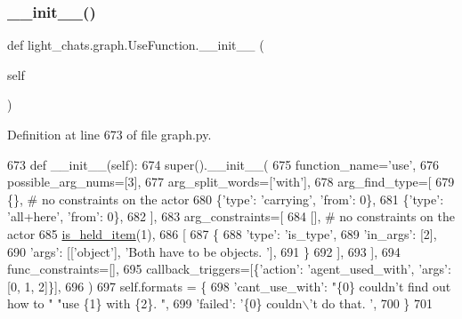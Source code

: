 \subsubsection{\texorpdfstring{\+\_\+\+\_\+init\+\_\+\+\_\+()}{\_\_init\_\_()}}
{\footnotesize\ttfamily def light\+\_\+chats.\+graph.\+Use\+Function.\+\_\+\+\_\+init\+\_\+\+\_\+ (\begin{DoxyParamCaption}\item[{}]{self }\end{DoxyParamCaption})}



Definition at line 673 of file graph.\+py.


\begin{DoxyCode}
673     \textcolor{keyword}{def }\_\_init\_\_(self):
674         super().\_\_init\_\_(
675             function\_name=\textcolor{stringliteral}{'use'},
676             possible\_arg\_nums=[3],
677             arg\_split\_words=[\textcolor{stringliteral}{'with'}],
678             arg\_find\_type=[
679                 \{\},  \textcolor{comment}{# no constraints on the actor}
680                 \{\textcolor{stringliteral}{'type'}: \textcolor{stringliteral}{'carrying'}, \textcolor{stringliteral}{'from'}: 0\},
681                 \{\textcolor{stringliteral}{'type'}: \textcolor{stringliteral}{'all+here'}, \textcolor{stringliteral}{'from'}: 0\},
682             ],
683             arg\_constraints=[
684                 [],  \textcolor{comment}{# no constraints on the actor}
685                 \hyperlink{namespacelight__chats_1_1graph_aa0be6ee7e9f549a7195bea9dfb962ad6}{is\_held\_item}(1),
686                 [
687                     \{
688                         \textcolor{stringliteral}{'type'}: \textcolor{stringliteral}{'is\_type'},
689                         \textcolor{stringliteral}{'in\_args'}: [2],
690                         \textcolor{stringliteral}{'args'}: [[\textcolor{stringliteral}{'object'}], \textcolor{stringliteral}{'Both have to be objects. '}],
691                     \}
692                 ],
693             ],
694             func\_constraints=[],
695             callback\_triggers=[\{\textcolor{stringliteral}{'action'}: \textcolor{stringliteral}{'agent\_used\_with'}, \textcolor{stringliteral}{'args'}: [0, 1, 2]\}],
696         )
697         self.formats = \{
698             \textcolor{stringliteral}{'cant\_use\_with'}: \textcolor{stringliteral}{"\{0\} couldn't find out how to "} \textcolor{stringliteral}{"use \{1\} with \{2\}. "},
699             \textcolor{stringliteral}{'failed'}: \textcolor{stringliteral}{'\{0\} couldn\(\backslash\)'t do that. '},
700         \}
701 
\end{DoxyCode}


